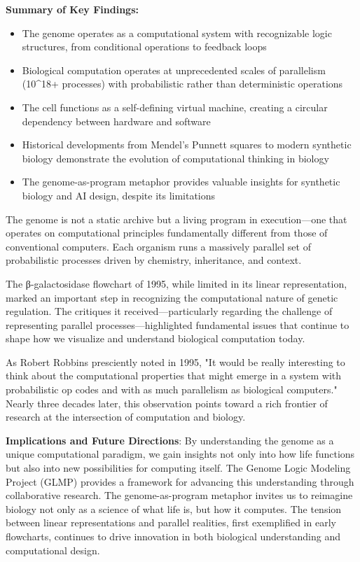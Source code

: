 \documentclass[11pt]{article}
\begin{document}
\textbf{Summary of Key Findings:}
\begin{itemize}
\item The genome operates as a computational system with recognizable logic structures, from conditional operations to feedback loops
\item Biological computation operates at unprecedented scales of parallelism (10^18+ processes) with probabilistic rather than deterministic operations
\item The cell functions as a self-defining virtual machine, creating a circular dependency between hardware and software
\item Historical developments from Mendel's Punnett squares to modern synthetic biology demonstrate the evolution of computational thinking in biology
\item The genome-as-program metaphor provides valuable insights for synthetic biology and AI design, despite its limitations
\end{itemize}

The genome is not a static archive but a living program in execution—one that operates on computational principles fundamentally different from those of conventional computers. Each organism runs a massively parallel set of probabilistic processes driven by chemistry, inheritance, and context.

The β-galactosidase flowchart of 1995, while limited in its linear representation, marked an important step in recognizing the computational nature of genetic regulation. The critiques it received—particularly regarding the challenge of representing parallel processes—highlighted fundamental issues that continue to shape how we visualize and understand biological computation today.

As Robert Robbins presciently noted in 1995, "It would be really interesting to think about the computational properties that might emerge in a system with probabilistic op codes and with as much parallelism as biological computers." Nearly three decades later, this observation points toward a rich frontier of research at the intersection of computation and biology.

\textbf{Implications and Future Directions}: By understanding the genome as a unique computational paradigm, we gain insights not only into how life functions but also into new possibilities for computing itself. The Genome Logic Modeling Project (GLMP) provides a framework for advancing this understanding through collaborative research. The genome-as-program metaphor invites us to reimagine biology not only as a science of what life is, but how it computes. The tension between linear representations and parallel realities, first exemplified in early flowcharts, continues to drive innovation in both biological understanding and computational design.
\end{document}

